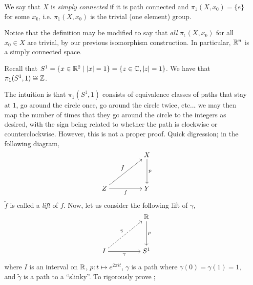 \begin{definition}
    We say that $X$ is \textit{simply connected} if it is path connected and $\pi_1(X, x_0) = \{e\}$ for some $x_0$, i.e. $\pi_1(X, x_0)$ is the trivial (one element) group.
\end{definition}
\noindent Notice that the definition may be modified to say that \textit{all} $\pi_1(X, x_0)$ for all $x_0 \in X$ are trivial, by our previous isomorphism construction. In particular, $\mathbb R^n$ is a simply connected space.
\begin{simplethm}
    Recall that $S^1 = \{x \in \mathbb R^2 \mid \left\lvert x \right\rvert = 1\} = \{z \in \mathbb C, \left\lvert z \right\rvert = 1\}$. We have that $\pi_1(S^1, 1) \cong \mathbb Z$. 
\end{simplethm}
\noindent The intuition is that $\pi_1(S^1, 1)$ consists of equivalence classes of paths that stay at $1$, go around the circle once, go around the circle twice, etc... we may then map the number of times that they go around the circle to the integers as desired, with the sign being related to whether the path is clockwise or counterclockwise. However, this is not a proper proof.
\medskip\newline
\noindent Quick digression; in the following diagram,
\[\begin{tikzcd}[ampersand replacement=\&,cramped]
	\&\& X \\
	\\
	Z \&\& Y
	\arrow["p", from=1-3, to=3-3]
	\arrow["{\tilde{f}}", from=3-1, to=1-3]
	\arrow["f"', from=3-1, to=3-3]
\end{tikzcd}\]
$\tilde{f}$ is called a \textit{lift} of $f$. Now, let us consider the following lift of $\gamma$,
\[\begin{tikzcd}[ampersand replacement=\&,cramped]
	\&\& {\RR} \\
	\\
	I \&\& {S^1}
	\arrow["p", from=1-3, to=3-3]
	\arrow["{\tilde{\gamma}}", dashed, from=3-1, to=1-3]
	\arrow["\gamma"', from=3-1, to=3-3]
\end{tikzcd}\]
where $I$ is an interval on $\mathbb R$, $p : t \mapsto e^{2 \pi i t}$, $\gamma$ is a path where $\gamma(0) = \gamma(1) = 1$, and $\tilde{\gamma}$ is a path to a ``slinky''. To rigorously prove ;
